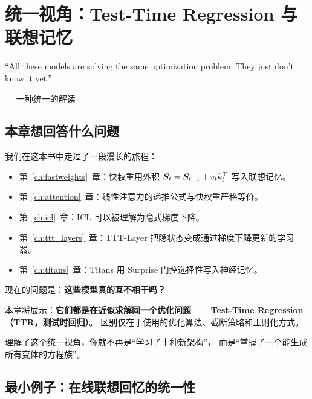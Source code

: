 \chapter{统一视角：Test-Time Regression 与联想记忆}
\label{ch:unified}

\epigraph{``All these models are solving the same optimization problem. They just don't know it yet.''}{--- 一种统一的解读}

\section{本章想回答什么问题}
\label{sec:ttr_question}

我们在这本书中走过了一段漫长的旅程：
\begin{itemize}
  \item 第~\ref{ch:fastweights}~章：快权重用外积 $\boldsymbol{S}_t = \boldsymbol{S}_{t-1} + v_t k_t^\top$ 写入联想记忆。
  \item 第~\ref{ch:attention}~章：线性注意力的递推公式与快权重严格等价。
  \item 第~\ref{ch:icl}~章：ICL 可以被理解为隐式梯度下降。
  \item 第~\ref{ch:ttt_layers}~章：TTT-Layer 把隐状态变成通过梯度下降更新的学习器。
  \item 第~\ref{ch:titans}~章：Titans 用 Surprise 门控选择性写入神经记忆。
\end{itemize}

现在的问题是：\textbf{这些模型真的互不相干吗？}

本章将展示：\textbf{它们都是在近似求解同一个优化问题}——
\textbf{Test-Time Regression（TTR，测试时回归）}。
区别仅在于使用的优化算法、截断策略和正则化方式。

理解了这个统一视角，你就不再是``学习了十种新架构''，
而是``掌握了一个能生成所有变体的方程族''。

\section{最小例子：在线联想回忆的统一性}
\label{sec:ttr_minimal}

